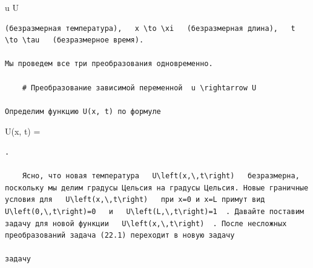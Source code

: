 \documentclass[
  ukrainian,
]{article}
\begin{document}
u \to U

\begin{verbatim}
(безразмерная температура),   x \to \xi   (безразмерная длина),   t \to \tau   (безразмерное время).

Мы проведем все три преобразования одновременно.

    # Преобразование зависимой переменной  u \rightarrow U

Определим функцию U(x, t) по формуле
\end{verbatim}

U(x, t) = 

\begin{verbatim}
.

    Ясно, что новая температура   U\left(x,\,t\right)   безразмерна, поскольку мы делим градусы Цельсия на градусы Цельсия. Новые граничные условия для   U\left(x,\,t\right)   при x=0 и x=L примут вид   U\left(0,\,t\right)=0   и   U\left(L,\,t\right)=1  . Давайте поставим задачу для новой функции   U\left(x,\,t\right)  . После несложных преобразований задача (22.1) переходит в новую задачу

задачу


\end{verbatim}
\end{document}
